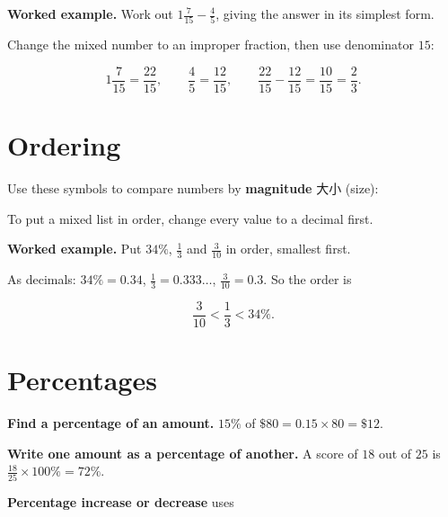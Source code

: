 \documentclass[11pt]{article}
\begin{document}
\textbf{Worked example.} Work out $1\frac{7}{15} - \frac{4}{5}$, giving the answer in its simplest form.

Change the mixed number to an improper fraction, then use denominator $15$:

\[
1\frac{7}{15} = \frac{22}{15}, \qquad \frac{4}{5} = \frac{12}{15}, \qquad \frac{22}{15} - \frac{12}{15} = \frac{10}{15} = \frac{2}{3}.
\]

\section*{Ordering}

Use these symbols to compare numbers by \textbf{magnitude} 大小 (size):

\begin{center}
\end{center}

To put a mixed list in order, change every value to a decimal first.

\textbf{Worked example.} Put $34\%$, $\frac{1}{3}$ and $\frac{3}{10}$ in order, smallest first.

As decimals: $34\% = 0.34$, $\frac{1}{3} = 0.333\ldots$, $\frac{3}{10} = 0.3$. So the order is

\[
\frac{3}{10} < \frac{1}{3} < 34\%.
\]

\section*{Percentages}

\textbf{Find a percentage of an amount.} $15\%$ of $\$80 = 0.15 \times 80 = \$12$.

\textbf{Write one amount as a percentage of another.} A score of $18$ out of $25$ is $\frac{18}{25} \times 100\% = 72\%$.

\textbf{Percentage increase or decrease} uses
\end{document}

